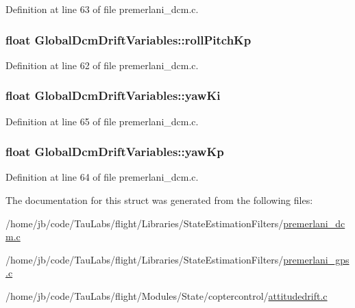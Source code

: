 \-Definition at line 63 of file premerlani\-\_\-dcm.\-c.

\hypertarget{struct_global_dcm_drift_variables_a99a127bcaabe2e53c45a56eb568bc020}{
\subsubsection[{roll\-Pitch\-Kp}]{\setlength{\rightskip}{0pt plus 5cm}float {\bf \-Global\-Dcm\-Drift\-Variables\-::roll\-Pitch\-Kp}}}\label{struct_global_dcm_drift_variables_a99a127bcaabe2e53c45a56eb568bc020}


\-Definition at line 62 of file premerlani\-\_\-dcm.\-c.

\hypertarget{struct_global_dcm_drift_variables_a81b393df9390fedc959c476b3c7381c6}{
\subsubsection[{yaw\-Ki}]{\setlength{\rightskip}{0pt plus 5cm}float {\bf \-Global\-Dcm\-Drift\-Variables\-::yaw\-Ki}}}\label{struct_global_dcm_drift_variables_a81b393df9390fedc959c476b3c7381c6}


\-Definition at line 65 of file premerlani\-\_\-dcm.\-c.

\hypertarget{struct_global_dcm_drift_variables_af0f020f038b168267dd7f4fab0d26178}{
\subsubsection[{yaw\-Kp}]{\setlength{\rightskip}{0pt plus 5cm}float {\bf \-Global\-Dcm\-Drift\-Variables\-::yaw\-Kp}}}\label{struct_global_dcm_drift_variables_af0f020f038b168267dd7f4fab0d26178}


\-Definition at line 64 of file premerlani\-\_\-dcm.\-c.



\-The documentation for this struct was generated from the following files\-:\begin{DoxyCompactItemize}
\item 
/home/jb/code/\-Tau\-Labs/flight/\-Libraries/\-State\-Estimation\-Filters/\hyperlink{premerlani__dcm_8c}{premerlani\-\_\-dcm.\-c}\item 
/home/jb/code/\-Tau\-Labs/flight/\-Libraries/\-State\-Estimation\-Filters/\hyperlink{premerlani__gps_8c}{premerlani\-\_\-gps.\-c}\item 
/home/jb/code/\-Tau\-Labs/flight/\-Modules/\-State/coptercontrol/\hyperlink{attitudedrift_8c}{attitudedrift.\-c}\end{DoxyCompactItemize}
